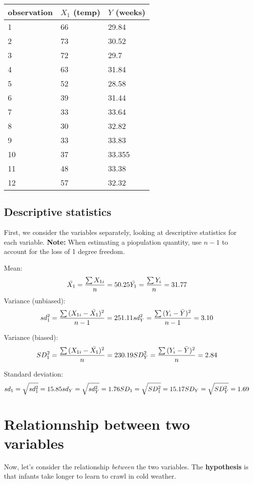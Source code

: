 \documentclass[
]{book}
\begin{document}
\begin{longtable}[]{@{}lll@{}}
\toprule
observation & \(X_1\) (temp) & \(Y\) (weeks)\tabularnewline
\midrule
\endhead
1 & 66 & 29.84\tabularnewline
2 & 73 & 30.52\tabularnewline
3 & 72 & 29.7\tabularnewline
4 & 63 & 31.84\tabularnewline
5 & 52 & 28.58\tabularnewline
6 & 39 & 31.44\tabularnewline
7 & 33 & 33.64\tabularnewline
8 & 30 & 32.82\tabularnewline
9 & 33 & 33.83\tabularnewline
10 & 37 & 33.355\tabularnewline
11 & 48 & 33.38\tabularnewline
12 & 57 & 32.32\tabularnewline
\bottomrule
\end{longtable}

\hypertarget{descriptive-statistics}{%
\subsection{Descriptive statistics}\label{descriptive-statistics}}

First, we consider the variables separately, looking at descriptive statistics for each variable.
\textbf{Note:} When estimating a piopulation quantity, use \(n-1\) to account for the loss of 1 degree freedom.

Mean:
\[
\bar{X_1} = \frac{\sum{X_{1i}}}{n}
= 50.25
\\
\bar{Y_1} = \frac{\sum{Y_{i}}}{n}
= 31.77
\]
Variance (unbiased):
\[
sd_{1}^2 = \frac{\sum{(X_{1i} - \bar{X_1})^2}}{n-1} = 251.11
\\
sd_{Y}^2 = \frac{\sum{(Y_{i} - \bar{Y})^2}}{n-1} = 3.10
\]

Variance (biased):
\[
SD_{1}^2 = \frac{\sum{(X_{1i} - \bar{X_1})^2}}{n} = 230.19
\\
SD_{Y}^2 = \frac{\sum{(Y_{i} - \bar{Y})^2}}{n} = 2.84
\]

Standard deviation:
\[
sd_1 = \sqrt{sd_{1}^2} = 15.85
\\
sd_Y = \sqrt{sd_{Y}^2} = 1.76
\\
SD_1 = \sqrt{SD_{1}^2} = 15.17
\\
SD_Y = \sqrt{SD_{Y}^2} = 1.69
\]

\hypertarget{relationnship-between-two-variables}{%
\section{Relationnship between two variables}\label{relationnship-between-two-variables}}

Now, let's consider the relationship \emph{between} the two variables. The \textbf{hypothesis} is that infants take longer to learn to crawl in cold weather.
\end{document}
